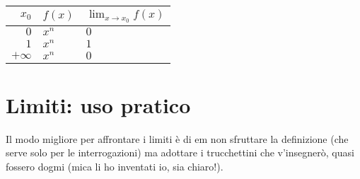 \begin{tabular}{|r|l|l|}
\hline
$x_0$ & $f(x)$ & $\lim_{x \rightarrow x_0} f(x)$\\
\hline
\hline
$0$ 		& $x^n$ & $0$ \\
$1$ 		& $x^n$ & $1$ \\
$+\infty$ 	& $x^n$ & $0$ \\
\hline
\hline
\end{tabular}

\section{Limiti: uso pratico}

Il modo migliore per affrontare i limiti è di {em non} sfruttare la definizione (che serve solo per le interrogazioni) ma adottare
i trucchettini che v'insegnerò, quasi fossero dogmi (mica li ho inventati io, sia chiaro!).

